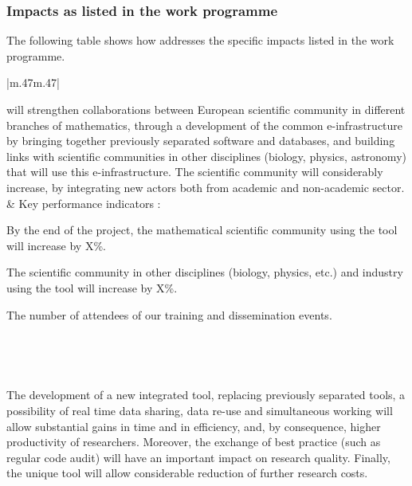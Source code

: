 \subsubsection{Impacts as listed in the work programme}

The following table shows how \TheProject  addresses the specific impacts
listed in the work programme.



\begin{supertabular}{|m{.47\textwidth}m{.47\textwidth}|}\hline\hline
{}\\\hline

  \TheProject will strengthen collaborations between European scientific community in
  different branches of mathematics, through a development of the common e-infrastructure
  by bringing together previously separated software and databases, and building links with
  scientific communities in other disciplines (biology, physics, astronomy) that will use
  this e-infrastructure. The scientific community will considerably increase, by
  integrating new actors both from academic and non-academic sector. 
& Key performance indicators :
  \begin{compactenum}
  \item By the end of the project, the mathematical scientific community using the tool
    will increase by X\%.
  \item The scientific community in other disciplines (biology, physics, etc.) 
  and industry using the tool will increase by X\%.
  \item The number of attendees of our training and dissemination events.
  \end{compactenum} \\\hline

  \hline{}\\\hline

  The development of a new integrated tool, replacing %
    previously separated tools, a possibility of real time data sharing, data re-use and
    simultaneous working will allow substantial gains in time and in efficiency, and, by
    consequence, higher productivity of researchers. Moreover, the exchange of best
    practice (such as regular code audit) will have an important impact on research
    quality. Finally, the unique tool will allow considerable reduction of further 
    research costs.


\end{supertabular}
